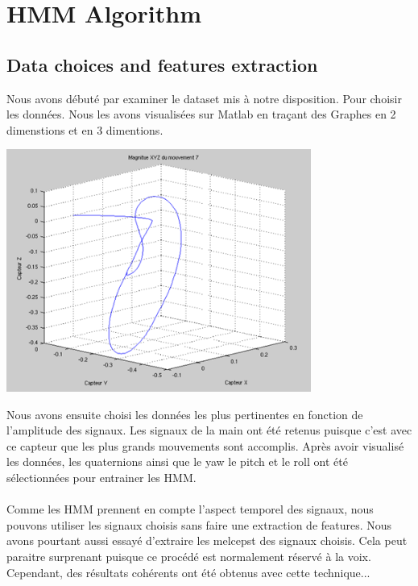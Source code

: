 
\chapter{HMM Algorithm} %

\label{Chapitre 2} %



\section{Data choices and features extraction}

Nous avons débuté par examiner le dataset mis à notre disposition. Pour choisir les données. Nous les avons visualisées sur Matlab en traçant des Graphes en 2 dimenstions et en 3 dimentions.

\begin{center} 
\hspace{15cm}
\includegraphics[width=10cm]{Ressources/Graphiques/MFB/Quaternions3D.png}
\end{center}
\vspace{0.5cm} 

Nous avons ensuite choisi les données les plus pertinentes en fonction de l'amplitude des signaux. Les signaux de la main ont été retenus puisque c'est avec ce capteur que les plus grands mouvements sont accomplis. Après avoir visualisé les données, les quaternions ainsi que le yaw le pitch et le roll ont été sélectionnées pour entrainer les HMM.
\\
\\
Comme les HMM prennent en compte l'aspect temporel des signaux, nous pouvons utiliser les signaux choisis sans faire une extraction de features.
Nous avons pourtant aussi essayé d'extraire les melcepst des signaux choisis. Cela peut paraitre surprenant puisque ce procédé est normalement réservé à la voix. Cependant, des résultats cohérents ont été obtenus avec cette technique...


